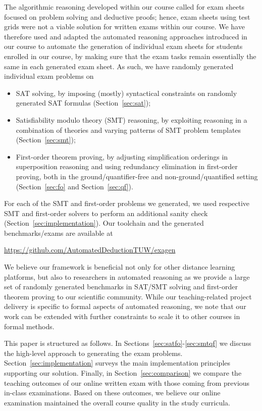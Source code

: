 The algorithmic reasoning developed within our
course called for exam sheets focused on problem solving and deductive
proofs; hence, exam sheets using test grids were not a viable solution
for written exams within our course.
We have therefore used and adapted the automated reasoning approaches introduced in our
course to automate the generation of individual exam sheets for
students enrolled in our course, by making sure that the exam tasks
remain essentially the same in each generated exam sheet. As such, we have randomly generated
individual exam problems on 
\begin{itemize}
\item
    SAT solving, by imposing (mostly) syntactical constraints on
    randomly generated SAT formulas (Section~\ref{sec:sat});
    
\item Satisfiability modulo theory (SMT) reasoning, by exploiting reasoning in a combination of theories
  and varying patterns of SMT problem templates
  (Section~\ref{sec:smt});
  
\item First-order theorem proving, by adjusting simplification
  orderings in superposition reasoning and using redundancy elimination
  in first-order proving, both in the ground/quantifier-free 
  and non-ground/quantified setting (Section~\ref{sec:fo}
  and Section~\ref{sec:qf}). 
\end{itemize}

For each of the SMT and first-order problems we generated, we used respective
SMT and first-order solvers to perform an additional sanity check
(Section~\ref{sec:implementation}).
Our toolchain and the generated benchmarks/exams are available at

\begin{center}
  \url{https://github.com/AutomatedDeductionTUW/exagen}
\end{center}

We believe our framework is beneficial not only for other
distance learning platforms, but also to researchers in automated
reasoning as we provide a large set of randomly generated benchmarks
in SAT/SMT solving and first-order theorem proving
to our scientific community.
While our teaching-related project delivery is specific to formal aspects of automated
reasoning, we note that our work can be extended with further
constraints to scale it to other courses in formal methods. 

This paper is structured as follows. In Sections~\ref{sec:satfo}-\ref{sec:smtqf}
we discuss the high-level approach to generating the exam
problems. Section~\ref{sec:implementation} surveys the main implementation principles supporting our
solution.
Finally, in Section~\ref{sec:comparison} we compare
the teaching outcomes of our online written exam with those coming
from previous in-class examinations. Based on these outcomes,
we believe our online examination maintained the overall course
quality in the study curricula. 

